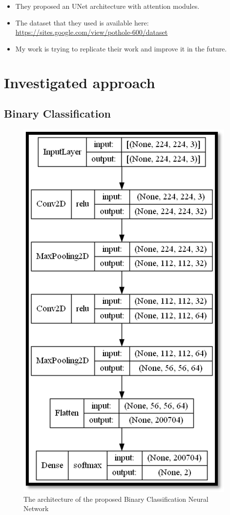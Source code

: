 \documentclass[runningheads,a4paper,11pt]{report}
\begin{document}
\begin{itemize}
	\item They proposed an UNet architecture with attention modules.
	\item The dataset that they used is available here: \url{https://sites.google.com/view/pothole-600/dataset}
	\item My work is trying to replicate their work and improve it in the future.
\end{itemize}


\chapter{Investigated approach}
\label{chapter:proposedApproach}

\section{Binary Classification}
\label{section:binaryClassification}

\begin{figure}[htbp]
    \centerline{\includegraphics{assets/binaryClassificationArchitecture.png}}  
    \caption{The architecture of the proposed Binary Classification Neural Network}
    \label{binaryClassificationFigure}
\end{figure}
\end{document}
